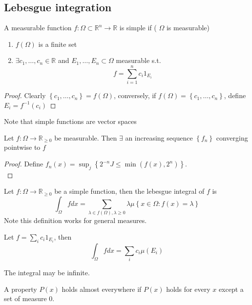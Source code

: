 \documentclass[../main.tex]{subfiles}
\begin{document}
\subsection{Lebesgue integration}
\begin{defn}
	A measurable function $f: \Omega \subset \mathbb{R}^n \to \mathbb{R}$ is simple if ( $\Omega$ is measurable)  
	\begin{enumerate}
	\item $ f( \Omega) $ is a finite set
	\item $\exists c_1, \ldots, c_n \in \mathbb{R} $ and $E_1,\ldots, E_n \subset \Omega$ measurable s.t.
		\[ 
		f= \sum_{i=1}^{ n}c_i 1_{E_i} 
		\]
		
	\end{enumerate}
	
\end{defn}
\begin{proof}
Clearly $ \left\{ c_1,\ldots, c_n \right\} = f( \Omega) $, conversely, if $f( \Omega) = \left\{ c_1,\ldots, c_n \right\}$, define $E_i = f^{-1}( c_i) $ 
\end{proof}
\begin{rmq}
Note that simple functions are vector spaces
\end{rmq}
\begin{lemma}
Let $f: \Omega\to \mathbb{R}_{ \geq 0} $ be measurable. Then $\exists$ an increasing sequence $ \left\{ f_n \right\} $ converging pointwise to $f$ 
\end{lemma}
\begin{proof}
Define $f_n( x) = \sup_j \left\{ 2^{-n}J \leq \min ( f( x) , 2^{n})  \right\}  $.\\
\end{proof}
\begin{defn}
	Let $f:\Omega\to \mathbb{R}_{ \geq 0} $ be a simple function, then the lebesgue integral of $f$ is
	\[ 
	\int_\Omega f dx = \sum_{ \lambda \in f( \Omega) , \lambda \geq 0}^{ } \lambda \mu \left\{ x\in \Omega: f( x) = \lambda \right\} 
	\]
Note this definition works for general measures.	
\end{defn}
\begin{rmq}
Let $f= \sum_{i}^{ } c_i 1_{E_i} $, then 
\[ 
\int_{ \Omega }^{  } f dx = \sum_{i}^{ } c_i \mu( E_i) 
\]

The integral may be infinite.
\end{rmq}
\begin{defn}
	A property $P( x) $ holds almost everywhere if $P( x) $ holds for every $x$ except a set of measure $0$.
\end{defn}
\end{document}
